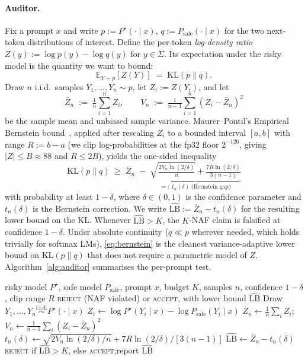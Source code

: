 \documentclass{article}
\begin{document}
\paragraph{Auditor.}
Fix a prompt $x$ and write $p:=P^\star(\cdot\mid x)$, $q:=P_{\mathrm{safe}}(\cdot\mid x)$ for the two next-token distributions of interest.  Define the per-token \emph{log-density ratio} $Z(y):=\log p(y)-\log q(y)$ for $y\in\Sigma$.  Its expectation under the risky model is the quantity we want to bound:
\[
  \mathbb E_{Y\sim p}[Z(Y)]\;=\;\mathrm{KL}(p\|q).
\]
Draw $n$ i.i.d.\ samples $Y_1,\dots,Y_n\sim p$, let $Z_i:=Z(Y_i)$, and let
\[
  \bar Z_n\;:=\;\tfrac{1}{n}\textstyle\sum_{i=1}^n Z_i,\qquad V_n\;:=\;\tfrac{1}{n-1}\textstyle\sum_{i=1}^n(Z_i-\bar Z_n)^2
\]
be the sample mean and unbiased sample variance.  Maurer--Pontil's Empirical Bernstein bound~\cite{maurer2009bernstein}, applied after rescaling $Z_i$ to a bounded interval $[a,b]$ with range $R:=b-a$ (we clip log-probabilities at the fp32 floor $2^{-126}$, giving $|Z|\le B\approx 88$ and $R\le 2B$), yields the one-sided inequality
\begin{equation}
\label{eq:bernstein}
  \mathrm{KL}(p\|q)\;\ge\;\bar Z_n\;-\;\underbrace{\sqrt{\tfrac{2 V_n\ln(2/\delta)}{n}}+\tfrac{7R\ln(2/\delta)}{3(n-1)}}_{=:\;t_n(\delta)\;\text{(Bernstein gap)}}
\end{equation}
with probability at least $1-\delta$, where $\delta\in(0,1)$ is the confidence parameter and $t_n(\delta)$ is the Bernstein correction.  We write $\widehat{\mathrm{LB}}:=\bar Z_n-t_n(\delta)$ for the resulting lower bound on the KL.  Whenever $\widehat{\mathrm{LB}}>K$, the $K$-NAF claim is falsified at confidence $1-\delta$.  Under absolute continuity ($q\ll p$ wherever needed, which holds trivially for softmax LMs), \eqref{eq:bernstein} is the cleanest variance-adaptive lower bound on $\mathrm{KL}(p\|q)$ that does not require a parametric model of $Z$.  Algorithm~\ref{alg:auditor} summarises the per-prompt test.

\begin{algorithm}[H]
\caption{Bernstein KL auditor (per prompt)}
\label{alg:auditor}
\small
\begin{algorithmic}[1]
\Require risky model $P^\star$, safe model $P_{\mathrm{safe}}$, prompt $x$, budget $K$, samples $n$, confidence $1{-}\delta$, clip range $R$
\Ensure \textsc{reject} (NAF violated) or \textsc{accept}, with lower bound $\widehat{\mathrm{LB}}$
\State Draw $Y_1,\dots,Y_n \overset{\text{i.i.d.}}{\sim} P^\star(\cdot\mid x)$
\State $Z_i \gets \log P^\star(Y_i\mid x) - \log P_{\mathrm{safe}}(Y_i\mid x)$ 
\State $\bar Z_n \gets \tfrac{1}{n}\sum_i Z_i$;\quad $V_n \gets \tfrac{1}{n-1}\sum_i (Z_i-\bar Z_n)^2$
\State $t_n(\delta) \gets \sqrt{2V_n\ln(2/\delta)/n} + 7R\ln(2/\delta)/[3(n-1)]$
\State $\widehat{\mathrm{LB}} \gets \bar Z_n - t_n(\delta)$
\State \Return \textsc{reject} if $\widehat{\mathrm{LB}}>K$, else \textsc{accept};\quad report $\widehat{\mathrm{LB}}$
\end{algorithmic}
\end{algorithm}
\end{document}
